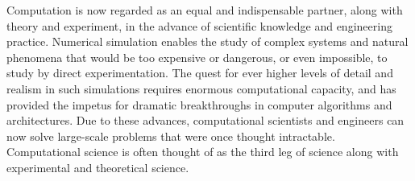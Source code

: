 \documentclass[a4paper,10pt]{article}
\begin{document}
Computation is now regarded as an equal and indispensable partner, along with theory and experiment, in the advance of scientific knowledge and engineering practice. Numerical simulation enables the study of complex systems and natural phenomena that would be too expensive or dangerous, or even impossible, to study by direct experimentation. The quest for ever higher levels of detail and realism in such simulations requires enormous computational capacity, and has provided the impetus for dramatic breakthroughs in computer algorithms and architectures. Due to these advances, computational scientists and engineers can now solve large-scale problems that were once thought intractable. Computational science is often thought of as the third leg of science along with experimental and theoretical science. 
 
 
 
 
\end{document}
